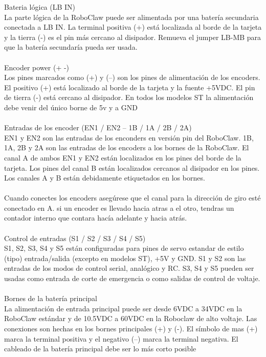 \documentclass[a4paper]{book}
\begin{document}
Bateria lógica (LB IN)\\
La parte lógica de la RoboClaw puede ser alimentada por una batería secundaria conectada a LB IN. La terminal positiva (+) está localizada al borde de la tarjeta y la tierra (-) es el pin más cercano al disipador. Remueva el jumper LB-MB para que la batería secundaría pueda ser usada.\\
\\
Encoder power (+ -)\\
Los pines marcados como (+) y (–) son los pines de alimentación  de los encoders. El positivo (+) está localizado al borde de la tarjeta y la fuente +5VDC. El pin de tierra (-) está cercano al disipador. En todos los modelos ST la alimentación debe venir del único borne de 5v  y a GND\\
\\
Entradas de los encoder (EN1 / EN2 – 1B / 1A / 2B / 2A)\\ 
EN1 y EN2 son las entradas de los enconders en versión pin del RoboClaw. 1B, 1A, 2B y 2A son las entradas de los encoders a los bornes de la RoboClaw. El canal A de ambos EN1 y EN2 están localizados en los pines del borde de la tarjeta. Los pines del canal B están localizados cercanos al disipador en los pines. Los canales A y B están debidamente etiquetados en los bornes.\\
\\
Cuando conectes los encoders asegúrese que el canal para la dirección de giro esté conectado en A. si un encoder es llevado hacia atras a el otro, tendras un contador interno que contara hacía adelante y hacia atrás. \\
\\
Control de entradas (S1 / S2 / S3 / S4 / S5)\\
S1, S2, S3, S4 y S5 están configuradas para pines de servo estandar de estilo (tipo) entrada/salida (excepto en modelos ST), +5V y GND. S1 y S2 son las entradas  de los modos de control serial, analógico y RC. S3, S4 y S5 pueden ser usadas como entrada de corte de emergencia o como salidas de control de voltaje.\\
\\
Bornes de la batería principal\\
La alimentación de entrada principal puede ser desde 6VDC a 34VDC en la RoboClaw estándar y de 10.5VDC a 60VDC en la Roboclaw de alto voltaje. Las conexiones son hechas en los bornes principales (+) y (-). El símbolo de mas (+) marca la terminal positiva y el negativo (–) marca la terminal negativa. El cableado de la batería principal debe ser lo más corto posible \\
\end{document}
